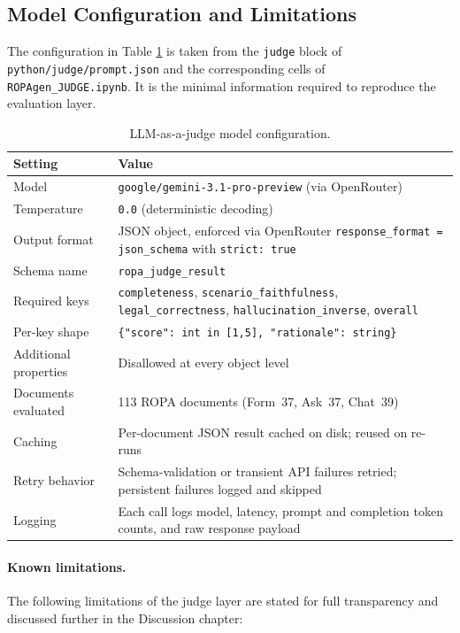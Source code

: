 \subsection{Model Configuration and Limitations}
\label{app:judge-config}

The configuration in Table \ref{tab:judge-config} is taken from the \texttt{judge} block of \texttt{python/judge/\allowbreak prompt.json} and the corresponding cells of \texttt{ROPAgen\_JUDGE.ipynb}. It is the minimal information required to reproduce the evaluation layer.

\begin{table}[htbp]
\centering
\small
\begin{tabularx}{\textwidth}{lX}
\toprule
\textbf{Setting} & \textbf{Value} \\
\midrule
Model & \texttt{google/gemini-3.1-pro-preview} (via OpenRouter) \\
Temperature & \texttt{0.0} (deterministic decoding) \\
Output format & JSON object, enforced via OpenRouter \texttt{response\_format = json\_schema} with \texttt{strict: true} \\
Schema name & \texttt{ropa\_judge\_result} \\
Required keys & \texttt{completeness}, \texttt{scenario\_faithfulness}, \texttt{legal\_correctness}, \texttt{hallucination\_inverse}, \texttt{overall} \\
Per-key shape & \texttt{\{"score": int in [1,5], "rationale": string\}} \\
Additional properties & Disallowed at every object level \\
Documents evaluated & 113 ROPA documents (Form~37, Ask~37, Chat~39) \\
Caching & Per-document JSON result cached on disk; reused on re-runs \\
Retry behavior & Schema-validation or transient API failures retried; persistent failures logged and skipped \\
Logging & Each call logs model, latency, prompt and completion token counts, and raw response payload \\
\bottomrule
\end{tabularx}
\caption{LLM-as-a-judge model configuration.}
\label{tab:judge-config}
\end{table}

\paragraph{Known limitations.} The following limitations of the judge layer are stated for full transparency and discussed further in the Discussion chapter:

